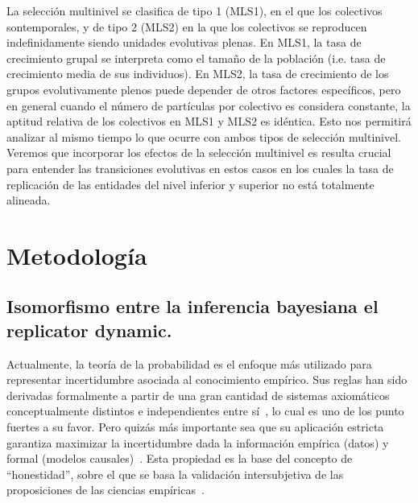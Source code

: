 \documentclass[a4paper,10pt]{article}
\begin{document}
La selección multinivel se clasifica de tipo 1 (MLS1), en el que los colectivos sontemporales, y de tipo 2 (MLS2) en la que los colectivos se reproducen indefinidamente siendo unidades evolutivas plenas.
En MLS1, la tasa de crecimiento grupal se interpreta como el tamaño de la población (i.e. tasa de crecimiento media de sus individuos).
En MLS2, la tasa de crecimiento de los grupos evolutivamente plenos puede depender de otros factores específicos, pero en general cuando el número de partículas por colectivo es considera constante, la aptitud relativa de los colectivos en MLS1 y MLS2 es idéntica.
Esto nos permitirá analizar al mismo tiempo lo que ocurre con ambos tipos de selección multinivel.
Veremos que incorporar los efectos de la selección multinivel es resulta crucial para entender las transiciones evolutivas en estos casos en los cuales la tasa de replicación de las entidades del nivel inferior y superior no está totalmente alineada.

\section{Metodología}

\subsection{Isomorfismo entre la inferencia bayesiana el replicator dynamic.}

Actualmente, la teoría de la probabilidad es el enfoque más utilizado para representar incertidumbre asociada al conocimiento empírico.
Sus reglas han sido derivadas formalmente a partir de una gran cantidad de sistemas axiomáticos conceptualmente distintos e independientes entre sí~\cite{halpern2017-RAU2}, lo cual es uno de los punto fuertes a su favor.
Pero quizás más importante sea que su aplicación estricta garantiza maximizar la incertidumbre dada la información empírica (datos) y formal (modelos causales)~\cite{jaynes2003}.
Esta propiedad es la base del concepto de ``honestidad'', sobre el que se basa la validación intersubjetiva de las proposiciones de las ciencias empíricas~\cite{landfried2021-conocimientoEmpirico}.
\end{document}

